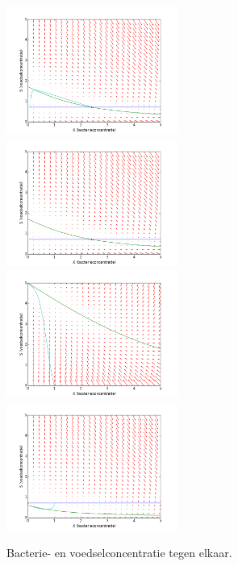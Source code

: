 \begin{figure}[h]
    \includegraphics[width=0.5\textwidth]{../images/fase_1.png}
    \includegraphics[width=0.5\textwidth]{../images/fase_2.png}
    \includegraphics[width=0.5\textwidth]{../images/fase_3.png}
    \includegraphics[width=0.5\textwidth]{../images/fase_4.png}
    \caption{Bacterie- en voedselconcentratie tegen elkaar.}
    \label{fig:fase_plots}
\end{figure}










